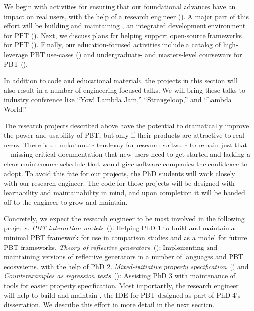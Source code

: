 We begin with activities for ensuring that our foundational
advances have an impact on real users, with the help of a research
engineer (). A major part of this
effort will be
building and maintaining \tyche, an integrated development environment for PBT
(). Next, we discuss plans for helping
support open-source frameworks for PBT ().
Finally, our
education-focused activities include a catalog of high-leverage PBT
use-cases () and undergraduate- and
masters-level courseware for PBT
().

In addition to code and educational materials, the projects in this section will
also result in a number of engineering-focused talks. We will bring these talks
to industry conference like ``Yow! Lambda Jam,'' ``Strangeloop,'' and
``Lambda World.''

%
The research projects described above have the potential to
dramatically improve the power and usability of PBT, but only
if their products are attractive to real users. There is an unfortunate tendency for
research software to remain just that---missing critical
documentation that new users need to get started and lacking a clear
maintenance schedule that would give software companies the confidence
to adopt.
To avoid this fate for our projects, the PhD students will work closely with our
research engineer. The code for those projects will be designed with learnability and
maintainability in mind, and upon
completion it will be handed off to the
engineer to grow and maintain.

Concretely, we expect the research engineer to be most involved in the following
projects. {\em PBT interaction models}~(): Helping PhD
  1 to build and maintain a minimal PBT framework for use in comparison studies
  and as a model for future PBT frameworks.
  {\em Theory of reflective generators}~():
  Implementing and maintaining versions of reflective generators in a number of
  languages and PBT ecosystems, with the help of PhD 2.
  {\em Mixed-initiative property
  specification}~() and {\em Counterexamples as
  regression tests}~():
  Assisting PhD
  3 with maintenance of tools for easier property specification.
%
Most importantly, the research engineer will help to build and maintain
\tyche{}, the IDE for PBT designed as part of PhD 4's dissertation. We
describe this effort in more detail in the next section.

